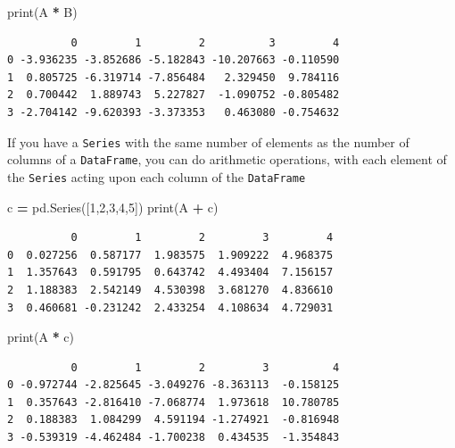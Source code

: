 \documentclass[
  letterpaper,
]{scrbook}
\newenvironment{Shaded}{\begin{snugshade}}{\end{snugshade}}
\newcommand{\BuiltInTok}[1]{#1}
\newcommand{\DecValTok}[1]{\textcolor[rgb]{0.00,0.00,0.81}{#1}}
\newcommand{\NormalTok}[1]{#1}
\newcommand{\OperatorTok}[1]{\textcolor[rgb]{0.81,0.36,0.00}{\textbf{#1}}}
\begin{document}
\begin{Shaded}
\begin{Highlighting}[]
\BuiltInTok{print}\NormalTok{(A }\OperatorTok{*}\NormalTok{ B)}
\end{Highlighting}
\end{Shaded}

\begin{verbatim}
          0         1         2          3         4
0 -3.936235 -3.852686 -5.182843 -10.207663 -0.110590
1  0.805725 -6.319714 -7.856484   2.329450  9.784116
2  0.700442  1.889743  5.227827  -1.090752 -0.805482
3 -2.704142 -9.620393 -3.373353   0.463080 -0.754632
\end{verbatim}

If you have a \texttt{Series} with the same number of elements as the number of columns of a \texttt{DataFrame}, you can do arithmetic operations, with each element of the \texttt{Series} acting upon each column of the \texttt{DataFrame}

\begin{Shaded}
\begin{Highlighting}[]
\NormalTok{c }\OperatorTok{=}\NormalTok{ pd.Series([}\DecValTok{1}\NormalTok{,}\DecValTok{2}\NormalTok{,}\DecValTok{3}\NormalTok{,}\DecValTok{4}\NormalTok{,}\DecValTok{5}\NormalTok{])}
\BuiltInTok{print}\NormalTok{(A }\OperatorTok{+}\NormalTok{ c)}
\end{Highlighting}
\end{Shaded}

\begin{verbatim}
          0         1         2         3         4
0  0.027256  0.587177  1.983575  1.909222  4.968375
1  1.357643  0.591795  0.643742  4.493404  7.156157
2  1.188383  2.542149  4.530398  3.681270  4.836610
3  0.460681 -0.231242  2.433254  4.108634  4.729031
\end{verbatim}

\begin{Shaded}
\begin{Highlighting}[]
\BuiltInTok{print}\NormalTok{(A }\OperatorTok{*}\NormalTok{ c)}
\end{Highlighting}
\end{Shaded}

\begin{verbatim}
          0         1         2         3          4
0 -0.972744 -2.825645 -3.049276 -8.363113  -0.158125
1  0.357643 -2.816410 -7.068774  1.973618  10.780785
2  0.188383  1.084299  4.591194 -1.274921  -0.816948
3 -0.539319 -4.462484 -1.700238  0.434535  -1.354843
\end{verbatim}
\end{document}
